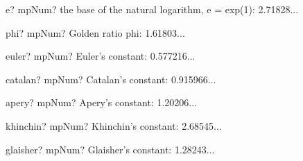 \vspace{0.6cm}

\begin{mpFunctionsExtract}
	\mpFunctionZero
	{e? mpNum?  the base of the natural logarithm, e = exp(1): 2.71828...}
\end{mpFunctionsExtract}



\vspace{0.6cm}

\begin{mpFunctionsExtract}
	\mpFunctionZero
	{phi? mpNum?  Golden ratio phi: 1.61803...}
\end{mpFunctionsExtract}


\vspace{0.6cm}

\begin{mpFunctionsExtract}
	\mpFunctionZero
	{euler? mpNum?  Euler's constant: 0.577216...}
\end{mpFunctionsExtract}



\vspace{0.6cm}

\begin{mpFunctionsExtract}
	\mpFunctionZero
	{catalan? mpNum?  Catalan's constant: 0.915966...}
\end{mpFunctionsExtract}



\vspace{0.6cm}

\begin{mpFunctionsExtract}
	\mpFunctionZero
	{apery? mpNum?  Apery's constant: 1.20206...}
\end{mpFunctionsExtract}



\vspace{0.6cm}

\begin{mpFunctionsExtract}
	\mpFunctionZero
	{khinchin? mpNum?  Khinchin's constant: 2.68545...}
\end{mpFunctionsExtract}



\vspace{0.6cm}

\begin{mpFunctionsExtract}
	\mpFunctionZero
	{glaisher? mpNum?  Glaisher's constant: 1.28243...}
\end{mpFunctionsExtract}



